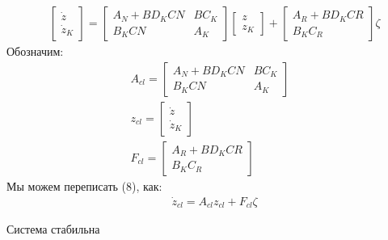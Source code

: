 \begin{align}
	&\begin{bmatrix}
		{\dot{z}} \\ {\dot{z}}_K 
	\end{bmatrix}
	=
	\begin{bmatrix}
		{A}_N + {B}{D}_K{C}{N} & {B}{C}_K \\
		{B}_K{C}{N} &{A}_K
	\end{bmatrix}
	\begin{bmatrix}
		{z} \\ {z}_K 
	\end{bmatrix}
	+
	\begin{bmatrix}
		{A}_R + {B}{D}_K{C}{R}\\ {B}_K{C}_R
	\end{bmatrix}
	{\zeta}
\end{align}
Обозначим:
\begin{align}
	{A}_{cl} = \begin{bmatrix}
		{A}_N + {B}{D}_K{C}{N} & {B}{C}_K \\
		{B}_K{C}{N} & {A}_K
	\end{bmatrix}
	\\
	{z}_{cl} = \begin{bmatrix}
		{\dot{z}} \\ {\dot{z}}_K 
	\end{bmatrix}
	\\
	{F}_{cl} = \begin{bmatrix}
		{A}_R + {B}{D}_K{C}{R}\\ {B}_K{C}_R
	\end{bmatrix}
\end{align}
Мы можем переписать (8), как:
\begin{align}
	&{\dot{z}}_{cl} = {A}_{cl} {z}_{cl}+ {F}_{cl}\zeta
\end{align}
\begin{theorem}
	Система стабильна
\end{theorem}
